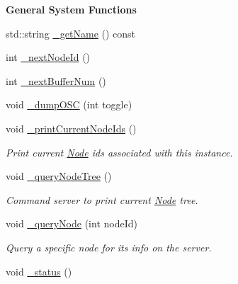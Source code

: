 \begin{Indent}{\bf General System Functions}\par
\begin{DoxyCompactItemize}
\item 
std\-::string \hyperlink{classColliderPlusPlus_1_1Client__Server_a8d70e3825b82efbf50ccbd9d85583fe5}{\-\_\-get\-Name} () const 
\item 
int \hyperlink{classColliderPlusPlus_1_1Client__Server_a4c45d5eb7b6bef9dd50c6376f3752d3e}{\-\_\-next\-Node\-Id} ()
\item 
int \hyperlink{classColliderPlusPlus_1_1Client__Server_af8224413e4b5bb059ba8b6165459dd7d}{\-\_\-next\-Buffer\-Num} ()
\item 
void \hyperlink{classColliderPlusPlus_1_1Client__Server_ae0fb9a18089043723fff0b11b57446ad}{\-\_\-dump\-O\-S\-C} (int toggle)
\item 
\hypertarget{classColliderPlusPlus_1_1Client__Server_a7d4511e809e49a26725750a8d3d859aa}{void \hyperlink{classColliderPlusPlus_1_1Client__Server_a7d4511e809e49a26725750a8d3d859aa}{\-\_\-print\-Current\-Node\-Ids} ()}\label{classColliderPlusPlus_1_1Client__Server_a7d4511e809e49a26725750a8d3d859aa}

\begin{DoxyCompactList}\small\item\em Print current \hyperlink{classColliderPlusPlus_1_1Node}{Node} ids associated with this instance. \end{DoxyCompactList}\item 
\hypertarget{classColliderPlusPlus_1_1Client__Server_a89364c9a2410454377434ee3eb2446ed}{void \hyperlink{classColliderPlusPlus_1_1Client__Server_a89364c9a2410454377434ee3eb2446ed}{\-\_\-query\-Node\-Tree} ()}\label{classColliderPlusPlus_1_1Client__Server_a89364c9a2410454377434ee3eb2446ed}

\begin{DoxyCompactList}\small\item\em Command server to print current \hyperlink{classColliderPlusPlus_1_1Node}{Node} tree. \end{DoxyCompactList}\item 
\hypertarget{classColliderPlusPlus_1_1Client__Server_a990e5c77c2579445279baa2f2850bf62}{void \hyperlink{classColliderPlusPlus_1_1Client__Server_a990e5c77c2579445279baa2f2850bf62}{\-\_\-query\-Node} (int node\-Id)}\label{classColliderPlusPlus_1_1Client__Server_a990e5c77c2579445279baa2f2850bf62}

\begin{DoxyCompactList}\small\item\em Query a specific node for its info on the server. \end{DoxyCompactList}\item 
\hypertarget{classColliderPlusPlus_1_1Client__Server_aac2f57518188e9c3fd9bede4c6bf7a6b}{void \hyperlink{classColliderPlusPlus_1_1Client__Server_aac2f57518188e9c3fd9bede4c6bf7a6b}{\-\_\-status} ()}\label{classColliderPlusPlus_1_1Client__Server_aac2f57518188e9c3fd9bede4c6bf7a6b}


\end{DoxyCompactItemize}
\end{Indent}
